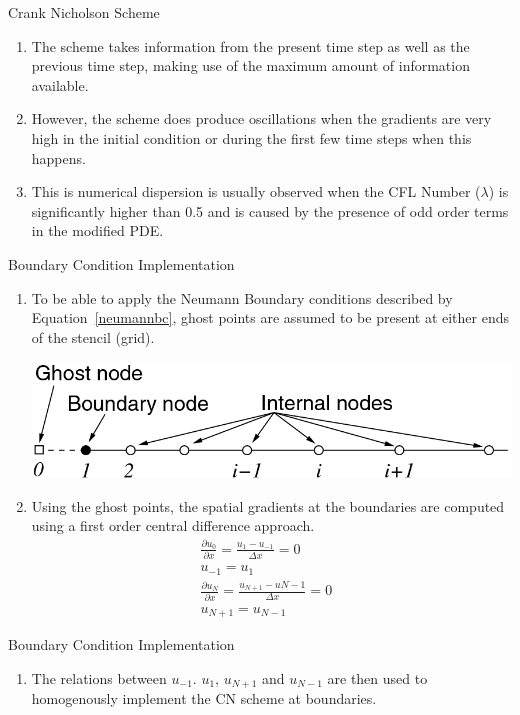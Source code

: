 \documentclass[10pt,compress]{beamer}
\begin{document}
\begin{frame}{Crank Nicholson Scheme}
\begin{enumerate}
\item The scheme takes information from the present time step as well as the previous time step, making use of the maximum amount of information available.
\item However, the scheme does produce oscillations when the gradients are very high in the initial condition or during the first few time steps when this happens.
\item This is numerical dispersion is usually observed when the CFL Number ($\lambda$) is significantly higher than 0.5 and is caused by the presence of odd order terms in the modified PDE.
\end{enumerate}
\end{frame}

\begin{frame}{Boundary Condition Implementation}
\begin{enumerate}
	\item To be able to apply the Neumann Boundary conditions described by Equation~\ref{neumannbc}, ghost points are assumed to be present at either ends of the stencil (grid).
\begin{center}
	\includegraphics[scale=1]{ghost.png}
\end{center}
\item Using the ghost points, the spatial gradients at the boundaries are computed using a first order central difference approach.
\begin{align*}	
	\frac{\partial u_{0}}{\partial x}=\frac{u_{1}-u_{-1}}{\Delta x}=0 & \\
	u_{-1}=u_{1} & \\
	\frac{\partial u_{N}}{\partial x}=\frac{u_{N+1}-u{N-1}}{\Delta x}=0 &\\
	u_{N+1}=u_{N-1} & 
\end{align*}
\end{enumerate}
\end{frame}

\begin{frame}{Boundary Condition Implementation}
\begin{enumerate}
	\item The relations between $u_{-1}$. $u_{1}$, $u_{N+1}$ and $u_{N-1}$ are then used to homogenously implement the CN scheme at boundaries. 
\end{enumerate}
\end{frame}
\end{document}
